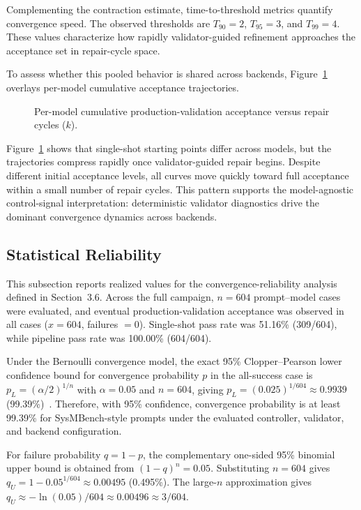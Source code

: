 Complementing the contraction estimate, time-to-threshold metrics quantify convergence speed. The observed thresholds are $T_{90}=2$, $T_{95}=3$, and $T_{99}=4$. These values characterize how rapidly validator-guided refinement approaches the acceptance set in repair-cycle space.

To assess whether this pooled behavior is shared across backends, Figure~\ref{fig:cumulative_convergence_by_model} overlays per-model cumulative acceptance trajectories.

\begin{figure}[H]
\centering

\caption{Per-model cumulative production-validation acceptance versus repair cycles ($k$).}
\label{fig:cumulative_convergence_by_model}
\end{figure}

Figure~\ref{fig:cumulative_convergence_by_model} shows that single-shot starting points differ across models, but the trajectories compress rapidly once validator-guided repair begins. Despite different initial acceptance levels, all curves move quickly toward full acceptance within a small number of repair cycles. This pattern supports the model-agnostic control-signal interpretation: deterministic validator diagnostics drive the dominant convergence dynamics across backends.

\subsection{Statistical Reliability}
This subsection reports realized values for the convergence-reliability analysis defined in Section~3.6. Across the full campaign, $n=604$ prompt--model cases were evaluated, and eventual production-validation acceptance was observed in all cases ($x=604$, failures $=0$). Single-shot pass rate was 51.16\% (309/604), while pipeline pass rate was 100.00\% (604/604).

Under the Bernoulli convergence model, the exact 95\% Clopper--Pearson lower confidence bound for convergence probability $p$ in the all-success case is $p_L=(\alpha/2)^{1/n}$ with $\alpha=0.05$ and $n=604$, giving $p_L=(0.025)^{1/604}\approx 0.9939$ (99.39\%)~\cite{clopper1934confidenceLimits}. Therefore, with 95\% confidence, convergence probability is at least 99.39\% for SysMBench-style prompts under the evaluated controller, validator, and backend configuration.

For failure probability $q=1-p$, the complementary one-sided 95\% binomial upper bound is obtained from $(1-q)^n=0.05$. Substituting $n=604$ gives $q_U=1-0.05^{1/604}\approx 0.00495$ (0.495\%). The large-$n$ approximation gives $q_U\approx-\ln(0.05)/604\approx 0.00496\approx 3/604$.

